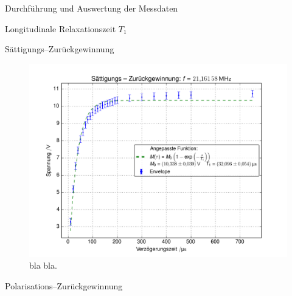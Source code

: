 \documentclass[pdftex, a4paper,11pt, twoside, ngerman]{report}
\begin{document}
\begin{chapter}{Durchführung und Auswertung der Messdaten}
    
    \newpage
    \begin{section}{
        Longitudinale Relaxationszeit $T_{1}$}
      \label{chpLongRelax}
      
      \begin{subsection}{Sättigungs--Zurückgewinnung}
        \label{chpLongRelaxSaettigung}
        
        
        
        
        \begin{figure}[htb]
          \centering
          \includegraphics[width=\textwidth]
          {Figures/SaettigungsZurueckgewinnung.png}
          \caption{bla bla.}
          \label{figSaettigung}
        \end{figure}
        
        
      \end{subsection}
      
      
      \newpage
      \begin{subsection}{Polarisations--Zurückgewinnung}
        \label{chpLongRelaxPolarisation}
        
        
        

\end{subsection}
\end{section}
\end{chapter}
\end{document}
